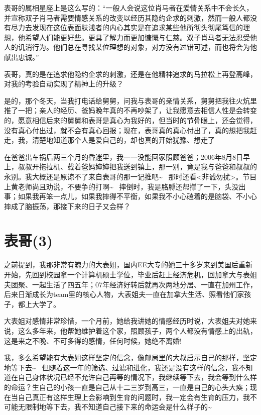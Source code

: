 \documentclass[12pt]{book}
\begin{document}
表哥的属相星座上是这么写的：“一般人会说这位肖马者在爱情关系中不会长久，并宣称双子肖马者需要情感关系的改变以经历其隐约企求的刺激，然而一般人都没有尽力去发现在这位表面肤浅者的内心其实是在追求某些他所彻头彻尾笃信的理想，他希望人们能更好些。更具了解力而更加慷慨与仁慈。双子肖马者无法忍受他人的讥消行为。他们总在寻找某位理想的对象，对方没有过错可述，而也将会为他献出忠诚。”

表哥，真的是在追求他隐约企求的刺激，还是在他精神追求的马拉松上再登高峰，对我的考验自动实现了精神上的升级？

是的，那个冬天，当我打电话给舅舅，问我与表哥的亲情关系，舅舅把我往火炕里推了一把；亲人的经历、爸妈晚年真的不再吵架了，让我愿意去相信人性是会转变的，愿意相信后来的舅舅和表哥是真心为我好的，但当时的节骨眼上，还会觉得，没有真心付出过，就不会有真心回报；现在，表哥真的真心付出了，真的想把我赶走，我，清楚地知道那个人是爱自己的，却也真的开始犹豫、想走了

在爸爸出车祸后两三个月的昏迷里，我一一没能回家照顾爸爸；2006年8月8日早上，叔叔开拖拉机、载着爸妈婶婶把我送到镇上，那一别，竟是我与爸爸和叔叔的永别。我大概还是原谅不了来自表哥的那一记推吧\textasciitilde{}~ 那时还看<非诚勿扰>。节目上黄老师尚且劝说，不要争的打啊\textasciitilde{}~ 摔倒时，我是胳膊还帮撑了一下，头没出事；如果我再笨一点儿，如果我摔得不平衡，如果我不小心磕着的是脑袋、不小心摔成了脑振荡，那接下来的日子又会样？

\section{表哥(3)}
\label{sec-44-3}

之前提到，我那非常有魄力的大表姐，国内EE大专的她三十多岁来到美国后重新开始，先回到校园拿一个计算机硕士学位，毕业后赶上经济危机，回加拿大与表姐夫团聚、一起生活了四五年；07年经济好转后就再次两地分居、一直在加州工作，后来日渐成长为team里的核心人物，大表姐夫一直在加拿大生活、照看他们家孩子，都上大学了。

大表姐对感情非常珍惜，一个月前，她给我讲她的情感经历时说，大表姐夫对她来说，这么多年来，他帮她维护着这个家，照顾孩子，两个人都没有情感上的出轨，这是来之不晚、不可多得的感情，任何时候，她绝不离婚! 

我，多么希望能有大表姐这样坚定的信念，像邮局里的大叔启示自己的那样，坚定地等下去\textasciitilde{}~ 但随着这一年的筛选、过滤和进化，我还是没有这样的信念，我不知道在自己身体状况已经不允许自己再等的情况下，我继续等下去，我会等到什么样的命运？生自己的小孩一直是自己从十二三岁到高三，一直是自己的心头大痪；现在当自己真正有这样生理上会影响到生育的问题时，我一定会有生育的压力，我不可能无限制地等下去，我不知道自己接下来的命运会是什么样子的\textasciitilde{}~ 
\end{document}
